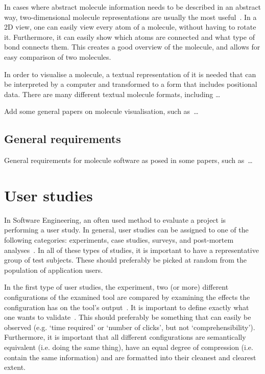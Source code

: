 In cases where abstract molecule information needs to be described in an abstract way, two-dimensional molecule representations are usually the most useful~\cite{zhou2009molecular}. In a 2D view, one can easily view every atom of a molecule, without having to rotate it. Furthermore, it can easily show which atoms are connected and what type of bond connects them. This creates a good overview of the molecule, and allows for easy comparison of two molecules.

In order to visualise a molecule, a textual representation of it is needed that can be interpreted by a computer and transformed to a form that includes positional data. There are many different textual molecule formats, including \ldots


Add some general papers on molecule visualisation, such as~\cite{chemaxon2014molecule, oboyle2011open, clark2006structure, fricker2004automated, dittmar1977algorithmic, boissonnat2001structure, batagelj2004pajek}\ldots


\subsection{General requirements}
General requirements for molecule software as posed in some papers, such as~\cite{aksela2008computer, taylor2013interface}\ldots

\nlipsum


\section{User studies}
In Software Engineering, an often used method to evaluate a project is performing a user study. In general, user studies can be assigned to one of the following categories: experiments, case studies, surveys, and post-mortem analyses~\cite{wohlin2003empirical}. In all of these types of studies, it is important to have a representative group of test subjects. These should preferably be picked at random from the population of application users.

In the first type of user studies, the experiment, two (or more) different configurations of the examined tool are compared by examining the effects the configuration has on the tool's output~\cite{wohlin2003empirical}. It is important to define exactly what one wants to validate~\cite{stein2009assessing}. This should preferably be something that can easily be observed (e.g. `time required' or `number of clicks', but not `comprehensibility'). Furthermore, it is important that all different configurations are semantically equivalent (i.e. doing the same thing), have an equal degree of compression (i.e. contain the same information) and are formatted into their cleanest and clearest extent.

